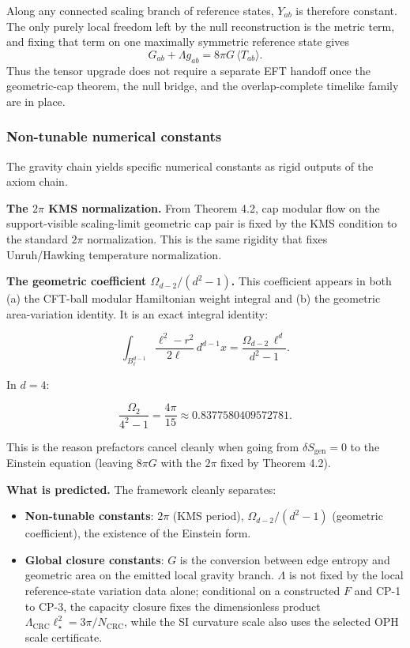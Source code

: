 Along any connected scaling branch of reference states, \(Y_{ab}\) is therefore constant. The only purely local freedom left by the null reconstruction is the metric term, and fixing that term on one maximally symmetric reference state gives
\[
G_{ab}+\Lambda g_{ab}=8\pi G\,\langle T_{ab}\rangle.
\]
Thus the tensor upgrade does not require a separate EFT handoff once the geometric-cap theorem, the null bridge, and the overlap-complete timelike family are in place.

\subsubsection{Non-tunable numerical constants}\label{58-non-tunable-numerical-constants}

The gravity chain yields specific numerical constants as rigid outputs of the axiom chain.

\textbf{The \(2\pi\) KMS normalization.} From Theorem 4.2, cap modular flow on the support-visible scaling-limit geometric cap pair is fixed by the KMS condition to the standard \(2\pi\) normalization. This is the same rigidity that fixes Unruh/Hawking temperature normalization.

\textbf{The geometric coefficient \(\Omega_{d-2}/(d^2 - 1)\).} This coefficient appears in both (a) the CFT-ball modular Hamiltonian weight integral and (b) the geometric area-variation identity. It is an exact integral identity:

\[
\int_{B^{d-1}_\ell} \frac{\ell^2 - r^2}{2\ell} \, d^{d-1}x
= \frac{\Omega_{d-2} \, \ell^d}{d^2 - 1}.
\]

In \(d = 4\):

\[
\frac{\Omega_2}{4^2 - 1} = \frac{4\pi}{15} \approx 0.8377580409572781.
\]

This is the reason prefactors cancel cleanly when going from \(\delta S_{\mathrm{gen}} = 0\) to the Einstein equation (leaving \(8\pi G\) with the \(2\pi\) fixed by Theorem 4.2).

\textbf{What is predicted.} The framework cleanly separates:

\begin{itemize}
\tightlist
\item
  \textbf{Non-tunable constants}: \(2\pi\) (KMS period), \(\Omega_{d-2}/(d^2-1)\) (geometric coefficient), the existence of the Einstein form.
\item
  \textbf{Global closure constants}: \(G\) is the conversion between edge entropy and geometric area on the emitted local gravity branch. \(\Lambda\) is not fixed by the local reference-state variation data alone; conditional on a constructed \(F\) and CP-1 to CP-3, the capacity closure fixes the dimensionless product \(\Lambda_{\mathrm{CRC}}\ell_\star^2=3\pi/N_{\mathrm{CRC}}\), while the SI curvature scale also uses the selected OPH scale certificate.
\end{itemize}

